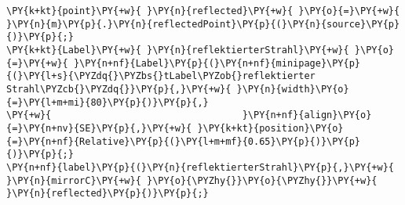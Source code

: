 \begin{Verbatim}[commandchars=\\\{\}]
\PY{k+kt}{point}\PY{+w}{ }\PY{n}{reflected}\PY{+w}{ }\PY{o}{=}\PY{+w}{ }\PY{n}{m}\PY{p}{.}\PY{n}{reflectedPoint}\PY{p}{(}\PY{n}{source}\PY{p}{)}\PY{p}{;}
\PY{k+kt}{Label}\PY{+w}{ }\PY{n}{reflektierterStrahl}\PY{+w}{ }\PY{o}{=}\PY{+w}{ }\PY{n+nf}{Label}\PY{p}{(}\PY{n+nf}{minipage}\PY{p}{(}\PY{l+s}{\PYZdq{}\PYZbs{}tLabel\PYZob{}reflektierter Strahl\PYZcb{}\PYZdq{}}\PY{p}{,}\PY{+w}{ }\PY{n}{width}\PY{o}{=}\PY{l+m+mi}{80}\PY{p}{)}\PY{p}{,}
\PY{+w}{                                  }\PY{n+nf}{align}\PY{o}{=}\PY{n+nv}{SE}\PY{p}{,}\PY{+w}{ }\PY{k+kt}{position}\PY{o}{=}\PY{n+nf}{Relative}\PY{p}{(}\PY{l+m+mf}{0.65}\PY{p}{)}\PY{p}{)}\PY{p}{;}
\PY{n+nf}{label}\PY{p}{(}\PY{n}{reflektierterStrahl}\PY{p}{,}\PY{+w}{ }\PY{n}{mirrorC}\PY{+w}{ }\PY{o}{\PYZhy{}}\PY{o}{\PYZhy{}}\PY{+w}{ }\PY{n}{reflected}\PY{p}{)}\PY{p}{;}
\end{Verbatim}

